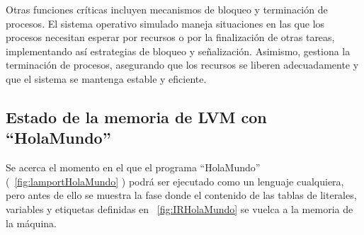 Otras funciones críticas incluyen mecanismos de bloqueo y terminación de procesos. El sistema operativo simulado maneja situaciones en las que los procesos necesitan esperar por recursos o por la finalización de otras tareas, implementando así estrategias de bloqueo y señalización. Asimismo, gestiona la terminación de procesos, asegurando que los recursos se liberen adecuadamente y que el sistema se mantenga estable y eficiente.

\subsection{Estado de la memoria de LVM con ``HolaMundo''}
Se acerca el momento en el que el programa ``HolaMundo'' (~\ref{fig:lamportHolaMundo} ) podrá ser ejecutado como un lenguaje cualquiera, pero antes de ello se muestra la fase donde el contenido de las tablas de literales, variables y etiquetas definidas en ~\ref{fig:IRHolaMundo} se vuelca a la memoria de la máquina.



